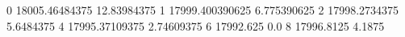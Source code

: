 0 18005.46484375 12.83984375
1 17999.400390625 6.775390625
2 17998.2734375 5.6484375
4 17995.37109375 2.74609375
6 17992.625 0.0
8 17996.8125 4.1875
